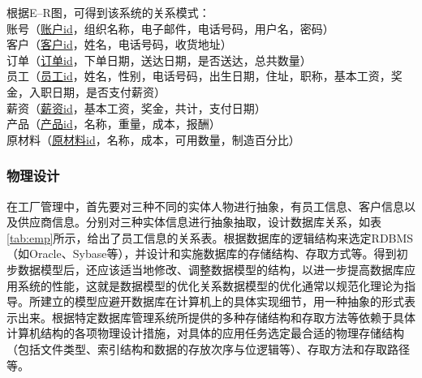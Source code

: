 根据E--R图，可得到该系统的关系模式：\\
账号（\underline{账户id}，组织名称，电子邮件，电话号码，用户名，密码）\\
客户（\underline{客户id}，姓名，电话号码，收货地址）\\
订单（\underline{订单id}，下单日期，送达日期，是否送达，总共数量）\\
员工（\underline{员工id}，姓名，性别，电话号码，出生日期，住址，职称，基本工资，奖金，入职日期，是否支付薪资）\\
薪资（\underline{薪资id}，基本工资，奖金，共计，支付日期）\\
产品（\underline{产品id}，名称，重量，成本，报酬）\\
原材料（\underline{原材料id}，名称，成本，可用数量，制造百分比）

\subsubsection{物理设计}

在工厂管理中，首先要对三种不同的实体人物进行抽象，有员工信息、客户信息以及供应商信息。分别对三种实体信息进行抽象抽取，设计数据库关系，如表\ref{tab:emp}所示，给出了员工信息的关系表。根据数据库的逻辑结构来选定RDBMS（如Oracle、Sybase等），并设计和实施数据库的存储结构、存取方式等。得到初步数据模型后，还应该适当地修改、调整数据模型的结构，以进一步提高数据库应用系统的性能，这就是数据模型的优化关系数据模型的优化通常以规范化理论为指导。所建立的模型应避开数据库在计算机上的具体实现细节，用一种抽象的形式表示出来。根据特定数据库管理系统所提供的多种存储结构和存取方法等依赖于具体计算机结构的各项物理设计措施，对具体的应用任务选定最合适的物理存储结构（包括文件类型、索引结构和数据的存放次序与位逻辑等）、存取方法和存取路径等。

